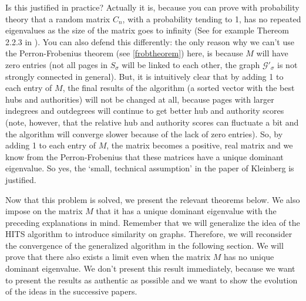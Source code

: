 \documentclass[a4paper,11pt]{report}
\newcommand{\graf}{\mathscr{G}}
\begin{document}
Is this justified in practice? Actually it is, because you can prove with probability theory that a random 
matrix $C_n$,  with a probability tending to 1, has no repeated eigenvalues as the size of the matrix goes to infinity (See for example Thereom 2.2.3 in \cite{random}).  You can also defend this differently: the only reason why we can't use the 
Perron-Frobenius theorem (see \ref{frobtheorem}) here, is because $M$ will have 
zero entries (not all pages in $S_\sigma$ will be linked to each other, the graph $\graf'_\sigma$ is not strongly connected in general). But,
it is intuitively clear that by adding 1 to each entry of $M$, the final results 
of the algorithm (a sorted vector with the best hubs and authorities) will not 
be changed at all, because pages with larger indegrees and outdegrees will continue to get better hub and authority scores (note, however, that the relative hub and authority scores can fluctuate a bit and the algorithm will converge slower because of the lack of zero 
entries). So, by adding 1 to each entry of $M$, the matrix becomes a positive, real matrix 
and we know from the Perron-Frobenius that these matrices have a unique dominant 
eigenvalue. So yes, the `small, technical assumption' in the paper of Kleinberg 
is justified.

Now that this problem is solved, we present the relevant theorems below. We also 
impose on the matrix $M$ that it has a unique dominant eigenvalue with the preceding explanations in mind. 
Remember that we will generalize the idea of the HITS algorithm to introduce 
similarity on graphs. Therefore, we will reconsider the 
convergence of the generalized algorithm in the following section. We will prove that there also exists a limit even when the matrix $M$ has no unique 
dominant eigenvalue. We don't present this result immediately,  
because we want to present the results as authentic as possible and we want to show 
the evolution of the ideas in the successive papers.
\end{document}
